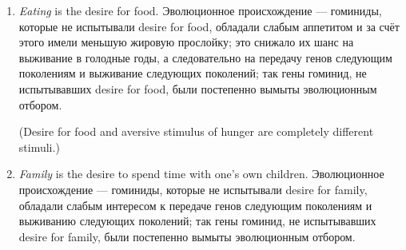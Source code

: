 \documentclass[11pt]{article}
\theoremstyle{remark}
\theoremstyle{definition}
\begin{document}
\begin{enumerate}


\item \textit{Eating} is the desire for food. Эволюционное происхождение --- гоминиды, которые не испытывали desire for food, обладали слабым аппетитом и за счёт этого имели меньшую жировую прослойку; это снижало их шанс на выживание в голодные годы, а следовательно на передачу генов следующим поколениям и выживание следующих поколений; так гены гоминид, не испытывавших desire for food, были постепенно вымыты эволюционным отбором. 



 
(Desire for food and aversive stimulus of hunger are completely different stimuli.)





\item \textit{Family} is the desire to spend time with one’s own children. Эволюционное происхождение --- гоминиды, которые не испытывали desire for family, обладали слабым интересом к передаче генов следующим поколениям и выживанию следующих поколений; так гены гоминид, не испытывавших desire for family, были постепенно вымыты эволюционным отбором.







\end{enumerate}
\end{document}
